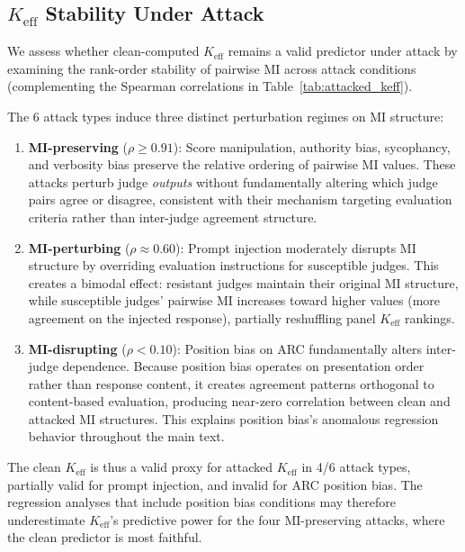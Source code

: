 \subsection{$K_{\mathrm{eff}}$ Stability Under Attack}
\label{app:keff_stability}

We assess whether clean-computed $K_{\mathrm{eff}}$ remains a valid predictor under attack by examining the rank-order stability of pairwise MI across attack conditions (complementing the Spearman correlations in Table~\ref{tab:attacked_keff}).

The 6 attack types induce three distinct perturbation regimes on MI structure:

\begin{enumerate}
\item \textbf{MI-preserving} ($\rho{\geq}0.91$): Score manipulation, authority bias, sycophancy, and verbosity bias preserve the relative ordering of pairwise MI values. These attacks perturb judge \emph{outputs} without fundamentally altering which judge pairs agree or disagree, consistent with their mechanism targeting evaluation criteria rather than inter-judge agreement structure.

\item \textbf{MI-perturbing} ($\rho{\approx}0.60$): Prompt injection moderately disrupts MI structure by overriding evaluation instructions for susceptible judges. This creates a bimodal effect: resistant judges maintain their original MI structure, while susceptible judges' pairwise MI increases toward higher values (more agreement on the injected response), partially reshuffling panel $K_{\mathrm{eff}}$ rankings.

\item \textbf{MI-disrupting} ($\rho{<}0.10$): Position bias on ARC fundamentally alters inter-judge dependence. Because position bias operates on presentation order rather than response content, it creates agreement patterns orthogonal to content-based evaluation, producing near-zero correlation between clean and attacked MI structures. This explains position bias's anomalous regression behavior throughout the main text.
\end{enumerate}

The clean $K_{\mathrm{eff}}$ is thus a valid proxy for attacked $K_{\mathrm{eff}}$ in 4/6 attack types, partially valid for prompt injection, and invalid for ARC position bias. The regression analyses that include position bias conditions may therefore underestimate $K_{\mathrm{eff}}$'s predictive power for the four MI-preserving attacks, where the clean predictor is most faithful.

